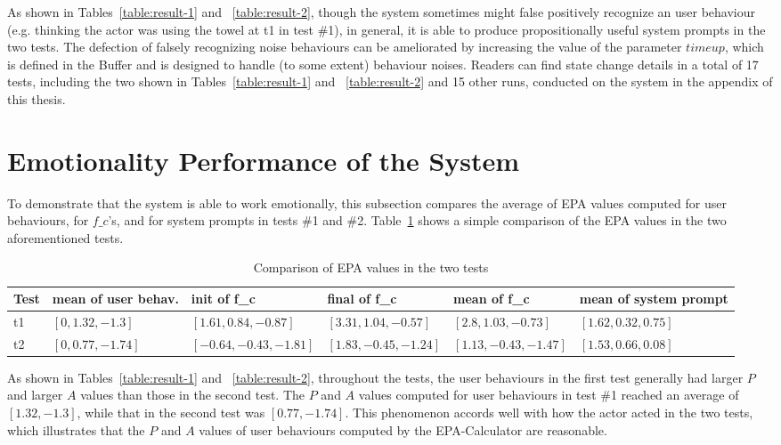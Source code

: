 As shown in Tables~\ref{table:result-1} and ~\ref{table:result-2}, though the system sometimes might false positively recognize an user behaviour (e.g. thinking the actor was using the towel at t1 in test \#1), in general, it is able to produce propositionally useful system prompts in the two tests. The defection of falsely recognizing noise behaviours can be ameliorated by increasing the value of the parameter $timeup$, which is defined in the Buffer and is designed to handle (to some extent) behaviour noises. Readers can find state change details in a total of 17 tests, including the two shown in Tables~\ref{table:result-1} and ~\ref{table:result-2} and 15 other runs, conducted on the system in the appendix of this thesis.


\section{Emotionality Performance of the System}

To demonstrate that the system is able to work emotionally, this subsection compares the average of EPA values computed for user behaviours, for $f\_c$'s, and for system prompts in tests \#1 and \#2. Table~\ref{table:compare-epa-the-two} shows a simple comparison of the EPA values in the two aforementioned tests. 

%
\begin{table}\footnotesize
\centering
\caption{Comparison of EPA values in the two tests}
\label{table:compare-epa-the-two}
\begin{tabular}{|  p{0.5cm} | p{2.1cm} |  p{3.1cm} |  p{2.9cm} |  p{2.9cm} | p{2.3cm} |}
\hline
Test & mean of user behav. & init of f\_c & final of f\_c & mean of f\_c & mean of system prompt \\ \hline
t1 & $[0,1.32,-1.3]$ & $[1.61,0.84,-0.87]$ & $[3.31,1.04,-0.57]$ & $[2.8,1.03,-0.73]$ & $[1.62,0.32,0.75]$ \\ \hline
t2 & $[0,0.77,-1.74]$ & $[-0.64,-0.43,-1.81]$ & $[1.83,-0.45,-1.24]$ & $[1.13,-0.43,-1.47]$ & $[1.53,0.66,0.08]$ \\ \hline
\end{tabular}
\end{table}

As shown in Tables~\ref{table:result-1} and ~\ref{table:result-2}, throughout the tests, the user behaviours in the first test generally had larger $P$ and larger $A$ values than those in the second test. The $P$ and $A$ values computed for user behaviours in test \#1 reached an average of $[1.32, -1.3]$, while that in the second test was $[0.77, -1.74]$. This phenomenon accords well with how the actor acted in the two tests, which illustrates that the $P$ and $A$ values of user behaviours computed by the EPA-Calculator are reasonable.

